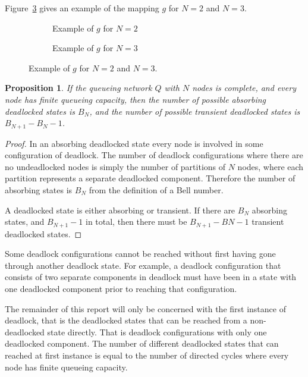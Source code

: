 \documentclass{article}
\newtheorem{proposition}{Proposition}
\begin{document}
Figure~\ref{fig:exampleofmapping} gives an example of the mapping $g$ for $N=2$ and $N=3$.

\begin{figure}[!htbp]
\begin{subfigure}[b]{\textwidth}
  \begin{center}
    
  \end{center}
  \caption{Example of $g$ for $N=2$}
  \label{fig:2Nmapping}
\end{subfigure}\newline
\newline
\begin{subfigure}[b]{\textwidth}
  
  \caption{Example of $g$ for $N=3$}
  \label{fig:3Nmapping}
\end{subfigure}
\caption{Example of $g$ for $N=2$ and $N=3$.}
\label{fig:exampleofmapping}
\end{figure}

\begin{proposition}
  If the queueing network $Q$ with $N$ nodes is complete, and every node has finite queueing capacity, then the number of possible absorbing deadlocked states is $B_N$, and the number of possible transient deadlocked states is $B_{N+1}-B_N-1$.
\end{proposition}

\begin{proof}
In an absorbing deadlocked state every node is involved in some configuration of deadlock.
The number of deadlock configurations where there are no undeadlocked nodes is simply the number of partitions of $N$ nodes, where each partition represents a separate deadlocked component.
Therefore the number of absorbing states is $B_N$ from the definition of a Bell number.

A deadlocked state is either absorbing or transient.
If there are $B_N$ absorbing states, and $B_{N+1}-1$ in total, then there must be $B_{N+1}-B{N}-1$ transient deadlocked states.
\end{proof}

Some deadlock configurations cannot be reached without first having gone through another deadlock state.
For example, a deadlock configuration that consists of two separate components in deadlock must have been in a state with one deadlocked component prior to reaching that configuration.

The remainder of this report will only be concerned with the first instance of deadlock, that is the deadlocked states that can be reached from a non-deadlocked state directly.
That is deadlock configurations with only one deadlocked component.
The number of different deadlocked states that can reached at first instance is equal to the number of directed cycles where every node has finite queueing capacity. %
\end{document}
